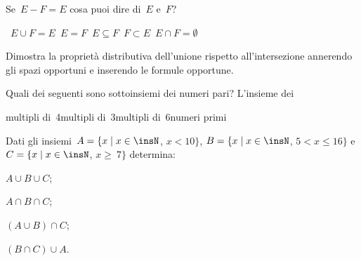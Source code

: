 \begin{esercizio}[\Ast]
\label{ese:5.126}
Se~$E-F=E$ cosa puoi dire di~$E$ e~$F$?
\begin{center}
 \boxA\quad~$E\cup F=E$\quad\boxB\quad~$E=F$\quad\boxC\quad~$E\subseteq F$\quad\boxD\quad~$F\subset E$\quad\boxE\quad~$E\cap F=\emptyset $
\end{center}
\end{esercizio}

\begin{esercizio}
\label{ese:5.127}
Dimostra la proprietà distributiva dell'unione rispetto all'intersezione annerendo gli spazi opportuni
e inserendo le formule opportune.
\begin{center}
 
\end{center}
\end{esercizio}

\begin{esercizio}[\Ast]
\label{ese:5.128}
Quali dei seguenti sono sottoinsiemi dei numeri pari? L'insieme dei

\begin{center}
 \boxA\quad multipli di~4\quad\boxB\quad multipli di~3\quad\boxC\quad multipli di~6\quad\boxD\quad numeri primi
\end{center}
\end{esercizio}

\begin{esercizio}
\label{ese:5.129}
Dati gli insiemi~$A=\{x\mid x\in\insN$, $x<10\}$, $B=\{x\mid x\in\insN$, $5<x\le 16\}$ e
$C=\{x\mid x\in\insN$, $x\ge~7\}$ determina:
\begin{multicols}{4}
\begin{enumeratea}
\item $A\cup B\cup C$;
\item $A\cap B\cap C$;
\item $(A\cup B)\cap C$;
\item $(B\cap C)\cup A$.
\end{enumeratea}
\end{multicols}
\end{esercizio}

